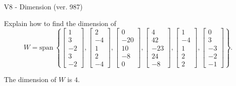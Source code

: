 \begin{exercise}
  \begin{exerciseTitle}V8 - Dimension (ver. 987)\end{exerciseTitle}
  \begin{exerciseStatement}
    Explain how to find the dimension of 
\[W=\mathrm{span}\ \left\{\left[\begin{array}{r}
1 \\
3 \\
-2 \\
3 \\
-2
\end{array}\right] , \left[\begin{array}{r}
2 \\
-4 \\
1 \\
2 \\
-4
\end{array}\right] , \left[\begin{array}{r}
0 \\
-20 \\
10 \\
-8 \\
0
\end{array}\right] , \left[\begin{array}{r}
4 \\
42 \\
-23 \\
24 \\
-8
\end{array}\right] , \left[\begin{array}{r}
1 \\
-4 \\
1 \\
2 \\
2
\end{array}\right] , \left[\begin{array}{r}
0 \\
3 \\
-3 \\
-2 \\
-1
\end{array}\right]\right\}.\]



  \end{exerciseStatement}
  \begin{exerciseAnswer}
   The dimension of \(W\) is  \(4\).
  


  \end{exerciseAnswer}
\end{exercise}